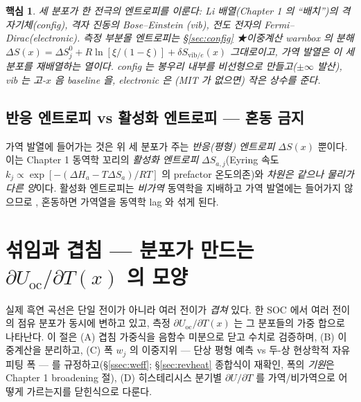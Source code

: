 \documentclass[11pt,a4paper]{article}
\newtheorem*{keybox}{핵심}
\newcommand{\oc}{\mathrm{oc}}
\newcommand{\vib}{\mathrm{vib}}
\begin{document}
\begin{keybox}
세 분포가 한 전극의 엔트로피를 이룬다: Li 배열(Chapter 1 의 ``배치'')의 \emph{격자기체}(config), 격자 진동의 \emph{Bose--Einstein}
(vib), 전도 전자의 \emph{Fermi--Dirac}(electronic). 측정 부분몰 엔트로피는 \S\ref{sec:config} ★이중계산
warnbox 의 분해 $\Delta S(x)=\Delta S^0_j+R\ln[\xi/(1-\xi)]+\delta S_{\vib/e}(x)$ 그대로이고, 가역 발열은 이 세 분포를
재배열하는 열이다. config 는 봉우리 \emph{내부}를 비선형으로 만들고($\pm\infty$ 발산), vib 는 고-$x$ 음
baseline 을, electronic 은 (MIT 가 없으면) 작은 상수를 준다.
\end{keybox}

\subsection{반응 엔트로피 vs 활성화 엔트로피 — 혼동 금지}
가역 발열에 들어가는 것은 위 세 분포가 주는 \emph{반응(평형) 엔트로피} $\Delta S(x)$ 뿐이다. 이는 Chapter 1
동역학 꼬리의 \emph{활성화 엔트로피} $\Delta S_{a,j}$(Eyring 속도 $k_j\propto\exp[-(\Delta H_a-T\Delta S_a)/RT]$
의 prefactor 온도의존)와 \emph{차원은 같으나 물리가 다른 양}이다. 활성화 엔트로피는 \emph{비가역} 동역학을
지배하고 가역 발열에는 들어가지 않으므로 \cite{msmr_partI}, 혼동하면 가역열을 동역학 lag 와 섞게 된다.

\section{섞임과 겹침 — 분포가 만드는 $\partial U_\oc/\partial T(x)$ 의 모양}\label{sec:mixing}
실제 흑연 곡선은 단일 전이가 아니라 여러 전이가 \emph{겹쳐} 있다. 한 SOC 에서 여러 전이의 점유 분포가 동시에
변하고 있고, 측정 $\partial U_\oc/\partial T(x)$ 는 그 분포들의 가중 합으로 나타난다. 이 절은 (A) 겹침 가중식을
음함수 미분으로 닫고 수치로 검증하며, (B) 이중계산을 분리하고, (C) 폭 $w_j$ 의 이중지위 — 단상 평형 예측 vs
두-상 현상학적 자유 피팅 폭 — 를 규정하고(\S\ref{ssec:weff}; \S\ref{sec:revheat} 종합식이 재확인, 폭의
\emph{기원}은 Chapter 1 broadening 절), (D) 히스테리시스 분기별 $\partial U/\partial T$ 를
가역/비가역으로 어떻게 가르는지를 닫힌식으로 다룬다.
\end{document}
